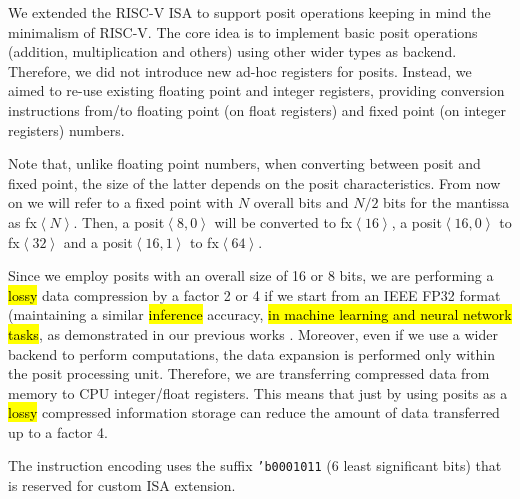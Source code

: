 We extended the RISC-V ISA to support posit operations keeping in mind the minimalism of RISC-V. The core idea is to implement basic posit operations (addition, multiplication and others) using other wider types as backend. Therefore, we did not introduce new ad-hoc registers for posits. Instead, we aimed to re-use existing floating point and integer registers, providing conversion instructions from/to floating point (on float registers) and fixed point (on integer registers) numbers. 

Note that, unlike floating point numbers, when converting between posit and fixed point, the size of the latter depends on the posit characteristics. From now on we will refer to  a fixed point with $N$ overall bits and $N/2$ bits for the mantissa  as fx$\left<N\right>$. Then, a posit$\left<8,0\right>$ will be converted to fx$\left<16\right>$,  a posit$\left<16,0\right>$ to fx$\left<32\right>$ and a posit$\left<16,1\right>$ to fx$\left<64\right>$.

Since we employ posits with an overall size of 16 or 8 bits, we are performing a \hl{lossy} data compression by a factor 2 or 4 if we start from an IEEE FP32 format (maintaining a similar \hl{inference} accuracy, \hl{in machine learning and neural network tasks}, as demonstrated in our previous works \cite{coco_et_al_ieeespm_2020,coco2020sensors}. Moreover, even if we use a wider backend to perform computations, the data expansion is performed only within the posit processing unit. Therefore, we are transferring compressed data from memory to CPU integer/float registers. This means that just by using posits as a \hl{lossy} compressed information storage can reduce the amount of data transferred up to a factor 4.

The instruction encoding uses the suffix \texttt{'b0001011} (6 least significant bits) that is reserved for custom ISA extension.

